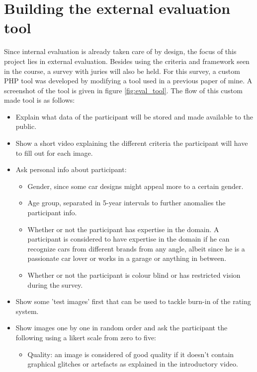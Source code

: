 \section{Building the external evaluation tool}
\label{sec:evaluation_tool}

Since internal evaluation is already taken care of by design, the focus of this project lies in external evaluation.
Besides using the criteria and framework seen in the course, a survey with juries will also be held.
For this survey, a custom PHP tool was developed by modifying a tool used in a previous paper \citep{bapproef} of mine.
A screenshot of the tool is given in figure \ref{fig:eval_tool}.
The flow of this custom made tool is as follows:
\begin{itemize}
    \item Explain what data of the participant will be stored and made available to the public.
    \item Show a short video explaining the different criteria the participant will have to fill out for each image.
    \item Ask personal info about participant:
    \begin{itemize}
        \item Gender, since some car designs might appeal more to a certain gender.
        \item Age group, separated in 5-year intervals to further anomalies the participant info. 
        \item Whether or not the participant has expertise in the domain. A participant is considered to have expertise in the domain if he can recognize cars from different brands from any angle, albeit since he is a passionate car lover or works in a garage or anything in between.
        \item Whether or not the participant is colour blind or has restricted vision during the survey.
    \end{itemize}
    \item Show some 'test images' first that can be used to tackle burn-in of the rating system.
    \item Show images one by one in random order and ask the participant the following using a likert scale from zero to five:
    \begin{itemize}
        \item Quality: an image is considered of good quality if it doesn't contain graphical glitches or artefacts as explained in the introductory video.

\end{itemize}
\end{itemize}
